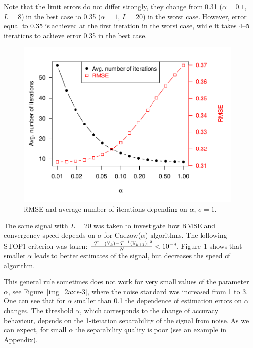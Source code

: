 \documentclass[sii]{ipart}
\begin{document}
Note that the limit errors do not differ strongly, they change from 0.31 ($\alpha=0.1$, $L=8$) in the best case to 0.35 ($\alpha=1$, $L=20$) in the worst case. However, error equal to 0.35 is achieved at the first iteration in the worst case, while it takes 4--5 iterations to achieve error 0.35 in the best case.

\smallskip
\begin{figure}[!hhh]
	\includegraphics[width = \columnwidth]{2axis.pdf}
	\caption{RMSE and average number of iterations depending on $\alpha$, $\sigma=1$.}
	\label{img_2axis}
\end{figure}
The same signal with $L = 20$ was taken to investigate how RMSE and convergency speed depends on $\alpha$ for Cadzow($\alpha$) algorithms. The following STOP1 criterion was taken: $\frac{\|\mathcal{T}^{-1}(\mathbb{Y}_k) - \mathcal{T}^{-1}(\mathbb{Y}_{k + 1})\|^2}{N} < 10^{-8}$. Figure~\ref{img_2axis} shows that smaller $\alpha$ leads to better estimates of the signal, but decreases the speed of algorithm.

This general rule sometimes does not work for very small values of the parameter $\alpha$, see Figure~\ref{img_2axis-3}, where
the noise standard was increased from 1 to 3. One can see that for $\alpha$ smaller than 0.1 the dependence of estimation errors on $\alpha$
changes.
The threshold $\alpha$, which corresponds to the change of accuracy behaviour, depends on the 1-iteration separability of the signal from noise.
As we can expect, for small $\alpha$ the separability quality is poor (see an example in Appendix).
\end{document}
